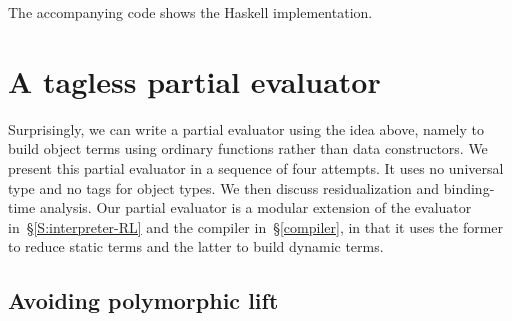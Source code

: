 The accompanying code shows the Haskell implementation. 
\begin{comment}
We have also implemented this compiler in Haskell. 
Since Haskell
has no (convenient, typed) staging facility, we had to emulate
it. To be precise, we defined a data type |ByteCode| with
constructors such as |Var|, |Lam|, |App|, |Fix|, and |INT|%
\footnote{\texttt{ByteCode} can be mapped to AST of Template Haskell
  (TH). The output of our compiler will then be assuredly type-correct TH.}
Whereas our representation of object terms uses HOAS,
our bytecode uses integer-named
variables to be realistic. 
We then define 
\begin{code}
newtype C t = C (Int -> (ByteCode t, Int)) 
\end{code}
where |Int| is the counter for creating fresh variable
names. We define the compiler by making |C| an instance of the
class |Symantics|.
The implementation\footnote{The implementation uses
GADTs because we also wanted to write a typed interpreter for 
the \texttt{ByteCode} \emph{data type}.} is quite similar (but slightly more
verbose) than the corresponding MetaOCaml code above. The
accompanying code gives the full details.
\end{comment}

\section{A tagless partial evaluator}\label{PE}

Surprisingly, we can write a partial evaluator using the idea above,
namely to build object terms using ordinary functions rather than data
constructors.  We present this partial evaluator in a sequence of four
attempts. It uses no universal type and no tags
for object types.  We then discuss residualization and binding-time
analysis.  Our partial evaluator is a modular extension of the evaluator
in~\S\ref{S:interpreter-RL} and the compiler in~\S\ref{compiler}, in
that it uses the former to reduce static terms and the latter to build
dynamic terms.

\subsection{Avoiding polymorphic lift}
\label{S:PE-lift}

